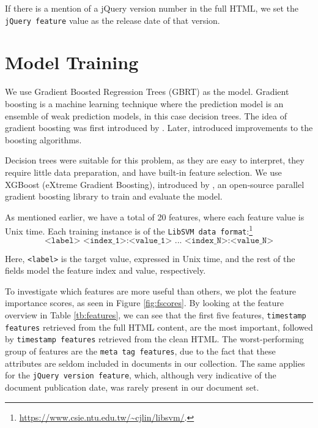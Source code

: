 If there is a mention of a jQuery version number in the full HTML, we set the \texttt{jQuery feature} value as the release date of that version.

\section{Model Training}
We use Gradient Boosted Regression Trees (GBRT) as the model. Gradient boosting is a machine learning technique where the prediction model is an ensemble of weak prediction models, in this case decision trees. The idea of gradient boosting was first introduced by \citet{breiman1997arcing}. Later, \citet{friedman2001greedy} introduced improvements to the boosting algorithms.

Decision trees were suitable for this problem, as they are easy to interpret, they require little data preparation, and have built-in feature selection. We use XGBoost (eXtreme Gradient Boosting), introduced by \citet{chen2016xgboost}, an open-source parallel gradient boosting library to train and evaluate the model.

As mentioned earlier, we have a total of 20 features, where each feature value is Unix time. Each training instance is of the \texttt{LibSVM data format}:\footnote{\url{https://www.csie.ntu.edu.tw/~cjlin/libsvm/}.}
\[ \texttt{<label> <index\_1>:<value\_1> ... <index\_N>:<value\_N>} \]

Here, \texttt{<label>} is the target value, expressed in Unix time, and the rest of the fields model the feature index and value, respectively.

To investigate which features are more useful than others, we plot the feature importance scores, as seen in Figure \ref{fig:fscores}. By looking at the feature overview in Table \ref{tb:features}, we can see that the first five features, \texttt{timestamp features} retrieved from the full HTML content, are the most important, followed by \texttt{timestamp features} retrieved from the clean HTML. The worst-performing group of features are the \texttt{meta tag features}, due to the fact that these attributes are seldom included in documents in our collection. The same applies for the \texttt{jQuery version feature}, which, although very indicative of the document publication date, was rarely present in our document set.

